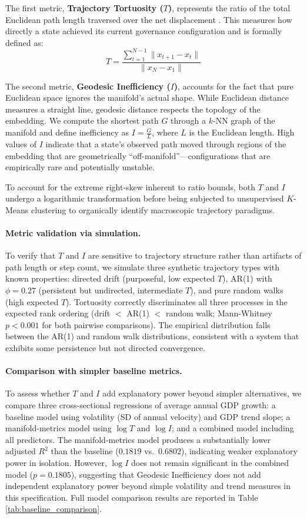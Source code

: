 \documentclass[12pt]{article}
\begin{document}
The first metric, \textbf{Trajectory Tortuosity ($T$)}, represents the ratio of the total Euclidean path length traversed over the net displacement \cite{benhamou2004reliably}. This measures how directly a state achieved its current governance configuration and is formally defined as:
$$T = \frac{\sum_{t=1}^{N-1} \lVert x_{t+1} - x_t \rVert}{\lVert x_N - x_1 \rVert}$$

The second metric, \textbf{Geodesic Inefficiency ($I$)}, accounts for the fact that pure Euclidean space ignores the manifold's actual shape. While Euclidean distance measures a straight line, geodesic distance respects the topology of the embedding. We compute the shortest path $G$ through a $k$-NN graph of the manifold and define inefficiency as $I = \frac{G}{L}$, where $L$ is the Euclidean length. High values of $I$ indicate that a state's observed path moved through regions of the embedding that are geometrically ``off-manifold''—configurations that are empirically rare and potentially unstable.

To account for the extreme right-skew inherent to ratio bounds, both $T$ and $I$ undergo a logarithmic transformation before being subjected to unsupervised $K$-Means clustering to organically identify macroscopic trajectory paradigms.

\paragraph{Metric validation via simulation.} To verify that $T$ and $I$ are sensitive to trajectory structure rather than artifacts of path length or step count, we simulate three synthetic trajectory types with known properties: directed drift (purposeful, low expected $T$), AR(1) with $\phi = 0.27$ (persistent but undirected, intermediate $T$), and pure random walks (high expected $T$). Tortuosity correctly discriminates all three processes in the expected rank ordering (drift $<$ AR(1) $<$ random walk; Mann-Whitney $p < 0.001$ for both pairwise comparisons). The empirical distribution falls between the AR(1) and random walk distributions, consistent with a system that exhibits some persistence but not directed convergence.

\paragraph{Comparison with simpler baseline metrics.} To assess whether $T$ and $I$ add explanatory power beyond simpler alternatives, we compare three cross-sectional regressions of average annual GDP growth: a baseline model using volatility (SD of annual velocity) and GDP trend slope; a manifold-metrics model using $\log T$ and $\log I$; and a combined model including all predictors. The manifold-metrics model produces a substantially lower adjusted $R^2$ than the baseline ($0.1819$ vs.\ $0.6802$), indicating weaker explanatory power in isolation. However, $\log I$ does not remain significant in the combined model ($p = 0.1805$), suggesting that Geodesic Inefficiency does not add independent explanatory power beyond simple volatility and trend measures in this specification. Full model comparison results are reported in Table \ref{tab:baseline_comparison}.
\end{document}
